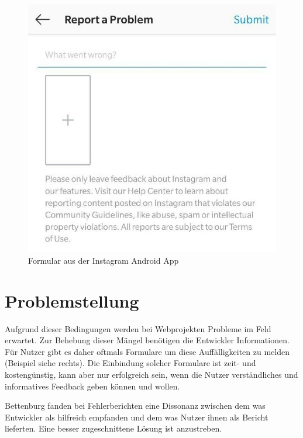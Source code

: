 \begin{figure}
	\centering
	\vspace{-10pt}
	\includegraphics[width=\linewidth]{img/instagram-feedback/instagram-feedback}
	\caption{Formular aus der Instagram \cite{Instagram} Android App}
	\label{fig:instagram-feedback-example}
\end{figure}

\section{Problemstellung}

Aufgrund dieser Bedingungen werden bei Webprojekten Probleme im Feld erwartet. Zur Behebung dieser Mängel benötigen die Entwickler Informationen. Für Nutzer gibt es daher oftmals Formulare um diese Auffälligkeiten zu melden (Beispiel siehe rechts). Die Einbindung solcher Formulare ist zeit- und kostengünstig, kann aber nur erfolgreich sein, wenn die Nutzer verständliches und informatives Feedback geben können und wollen.

Bettenburg \etal \cite{WhatMakesAGoodBugReport} fanden bei Fehlerberichten eine Dissonanz zwischen dem was Entwickler als hilfreich empfanden und dem was Nutzer ihnen als Bericht lieferten. Eine besser zugeschnittene Lösung ist anzustreben. %

